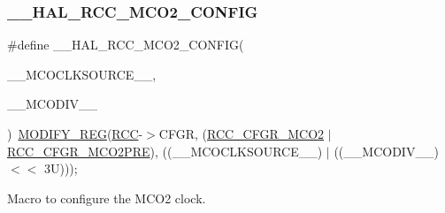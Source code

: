 \subsubsection{\texorpdfstring{\+\_\+\+\_\+\+H\+A\+L\+\_\+\+R\+C\+C\+\_\+\+M\+C\+O2\+\_\+\+C\+O\+N\+F\+IG}{\_\_HAL\_RCC\_MCO2\_CONFIG}}
{\footnotesize\ttfamily \#define \+\_\+\+\_\+\+H\+A\+L\+\_\+\+R\+C\+C\+\_\+\+M\+C\+O2\+\_\+\+C\+O\+N\+F\+IG(\begin{DoxyParamCaption}\item[{}]{\+\_\+\+\_\+\+M\+C\+O\+C\+L\+K\+S\+O\+U\+R\+C\+E\+\_\+\+\_\+,  }\item[{}]{\+\_\+\+\_\+\+M\+C\+O\+D\+I\+V\+\_\+\+\_\+ }\end{DoxyParamCaption})~\hyperlink{group___exported__macro_ga6553c99f510c3bab8cc0a91602053247}{M\+O\+D\+I\+F\+Y\+\_\+\+R\+EG}(\hyperlink{group___peripheral__declaration_ga74944438a086975793d26ae48d5882d4}{R\+CC}-\/$>$C\+F\+GR, (\hyperlink{group___peripheral___registers___bits___definition_ga022248a1167714f4d847b89243dc5244}{R\+C\+C\+\_\+\+C\+F\+G\+R\+\_\+\+M\+C\+O2} $\vert$ \hyperlink{group___peripheral___registers___bits___definition_gae387252f29b6f98cc1fffc4fa0719b6e}{R\+C\+C\+\_\+\+C\+F\+G\+R\+\_\+\+M\+C\+O2\+P\+RE}), ((\+\_\+\+\_\+\+M\+C\+O\+C\+L\+K\+S\+O\+U\+R\+C\+E\+\_\+\+\_\+) $\vert$ ((\+\_\+\+\_\+\+M\+C\+O\+D\+I\+V\+\_\+\+\_\+) $<$$<$ 3\+U)));}



Macro to configure the M\+C\+O2 clock. 


